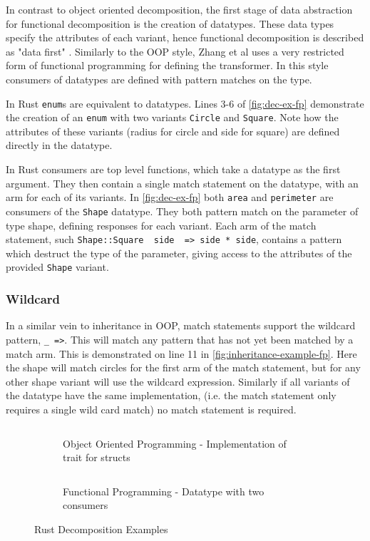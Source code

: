 \documentclass[ oneside,%
                    author={James Elgar},
                    degree={MEng},
                     title={Bidirectional transformer between functional and \\ object-oriented programming in Rust},
                  subtitle={}]{dissertation}
\newcommand{\weixin}{Zhang et al }
\newcommand{\rust}[1]{\texttt{#1}}
\newcommand{\codefile}[2]{\inputminted[xleftmargin=20pt,linenos, breaklines]{#1}{#2}}
\newcommand{\rustfile}[1]{\codefile{rust}{../#1.rs}}
\newcommand{\rustexample}[1]{\rustfile{examples/src/#1}}
\begin{document}
In contrast to object oriented decomposition, the first stage of data abstraction for functional decomposition is the creation of datatypes.
These data types specify the attributes of each variant, hence functional decomposition is described as "data first" \cite{food}. 
Similarly to the OOP style, \weixin uses a very restricted form of functional programming for defining the transformer.  
In this style consumers of datatypes are defined with pattern matches on the type.

In Rust \rust{enum}s are equivalent to datatypes. Lines 3-6 of \autoref{fig:dec-ex-fp} demonstrate the creation of an \rust{enum} with two variants \rust{Circle} and \rust{Square}. Note how the attributes of these variants (radius for circle and side for square) are defined directly in the datatype.

In Rust consumers are top level functions, which take a datatype as the first argument. They then contain a single match statement on the datatype, with an arm for each of its variants. In \autoref{fig:dec-ex-fp} both \rust{area} and \rust{perimeter} are consumers of the \rust{Shape} datatype. 
They both pattern match on the parameter of type shape, defining responses for each variant. Each arm of the match statement, such \rust{Shape::Square { side } => side * side}, contains a pattern which destruct the type of the parameter, giving access to the attributes of the provided \rust{Shape} variant.

\subsubsection{Wildcard}

In a similar vein to inheritance in OOP, match statements support the wildcard pattern, \rust{_ =>}. This will match any pattern that has not yet been matched by a match arm. This is demonstrated on line 11 in \autoref{fig:inheritance-example-fp}. Here the shape will match circles for the first arm of the match statement, but for any other shape variant will use the wildcard expression.
Similarly if all variants of the datatype have the same implementation, (i.e. the match statement only requires a single wild card match) no match statement is required. 

\begin{figure}
\centering
\begin{subfigure}{.5\textwidth}
    \rustexample{shape/oop}
    \caption{Object Oriented Programming - Implementation of trait for structs}
    \label{fig:dec-ex-oop}
\end{subfigure}%
\begin{subfigure}{.5\textwidth}
    \rustexample{shape/fp}
    \caption{Functional Programming - Datatype with two consumers}
    \label{fig:dec-ex-fp}
\end{subfigure}
\caption{Rust Decomposition Examples}
\label{fig:dec-ex}
\end{figure}
\end{document}
